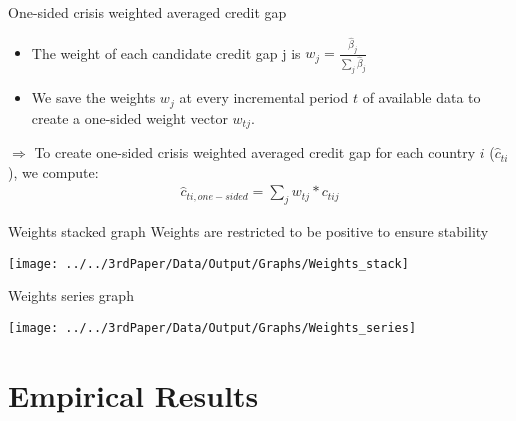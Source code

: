 \documentclass[
  ignorenonframetext,
]{beamer}
\begin{document}
\begin{frame}{One-sided crisis weighted averaged credit gap}
\protect\hypertarget{one-sided-crisis-weighted-averaged-credit-gap}{}
\begin{itemize}
\item
  The weight of each candidate credit gap j is
  \(w_j = \frac{\hat{\beta}_j}{\sum\nolimits_j\hat{\beta}_j}\)
\item
  We save the weights \(w_j\) at every incremental period \(t\) of
  available data to create a one-sided weight vector \(w_{tj}\).
\end{itemize}

\(\Rightarrow\) To create one-sided crisis weighted averaged credit gap
for each country \(i\) (\(\hat{c}_{ti}\)), we compute: \begin{align}
\hat{c}_{ti,one-sided} = \sum\nolimits_{j} w_{tj} * c_{tij}
\end{align}
\end{frame}

\begin{frame}{Weights stacked graph}
\protect\hypertarget{weights-stacked-graph}{}
Weights are restricted to be positive to ensure stability

\begin{center}\texttt{[image: ../../3rdPaper/Data/Output/Graphs/Weights\_stack]} \end{center}
\end{frame}

\begin{frame}{Weights series graph}
\protect\hypertarget{weights-series-graph}{}
\begin{center}\texttt{[image: ../../3rdPaper/Data/Output/Graphs/Weights\_series]} \end{center}
\end{frame}

\hypertarget{empirical-results}{%
\section{Empirical Results}\label{empirical-results}}
\end{document}
